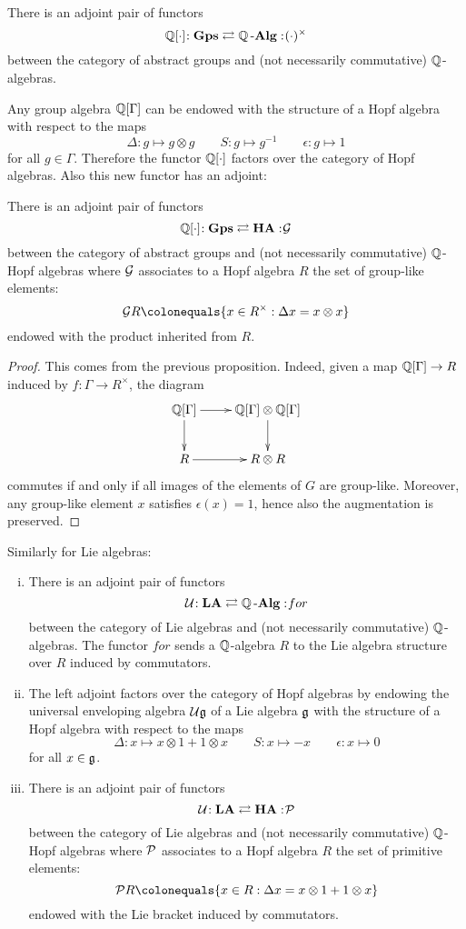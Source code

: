 \begin{prop}
There is an adjoint pair of functors
\[
\mathbb{Q}[\cdot]\negmedspace: \operatorname{\bf{Gps}}\rightleftarrows \mathbb{Q}\operatorname{\bf{-Alg}}:\negmedspace (\cdot)^\times
\]
between the category of abstract groups and (not necessarily commutative) $\mathbb{Q}$-algebras.
\end{prop}

Any group algebra $\mathbb{Q}[\Gamma]$ can be endowed with the structure of a Hopf algebra with respect to the maps
\[
\Delta: g\mapsto g\otimes g\qquad
S: g\mapsto g^{-1}\qquad
\epsilon: g\mapsto1
\]
for all $g\in\Gamma$. Therefore the functor $\mathbb{Q}[\cdot]$ factors over the category of Hopf algebras. Also this new functor has an adjoint:
\begin{prop}
There is an adjoint pair of functors
\[
\mathbb{Q}[\cdot]\negmedspace: \operatorname{\bf{Gps}}\rightleftarrows \operatorname{\bf{HA}}:\negmedspace \mathcal{G}
\]
between the category of abstract groups and (not necessarily commutative) $\mathbb{Q}$-Hopf algebras where $\mathcal{G}$ associates to a Hopf algebra $R$ the set of group-like elements:
\[
\cG R \colonequals\{x\in R^\times: \Delta x=x\otimes x\}
\]
endowed with the product inherited from $R$.
\end{prop}

\begin{proof}
This comes from the previous proposition. Indeed, given a map $\mathbb{Q}[\Gamma]\to R$ induced by $f:\Gamma\to R^\times$, the diagram 
$$\xymatrix{
\Q[\Gamma]\ar[r]\ar[d]&\Q[\Gamma]\otimes\Q[\Gamma]\ar[d]\\
R\ar[r]&R\otimes R
}$$
commutes if and only if all images of the elements of $G$ are group-like. Moreover, any group-like element $x$ satisfies $\epsilon(x)=1$, hence also the augmentation is preserved.
\end{proof}

Similarly for Lie algebras:
\begin{prop}\begin{enumerate}[(i)]
\item There is an adjoint pair of functors
\[
\mathcal{U}\negmedspace: \operatorname{\bf{LA}}\rightleftarrows \mathbb{Q}\operatorname{\bf{-Alg}}:\negmedspace for
\]
between the category of Lie algebras and (not necessarily commutative) $\mathbb{Q}$-algebras. The functor $for$ sends a $\mathbb{Q}$-algebra $R$ to the Lie algebra structure over $R$ induced by commutators.
\item The left adjoint factors over the category of Hopf algebras by endowing the universal enveloping algebra $\mathcal{U}\mathfrak{g}$ of a Lie algebra $\mathfrak{g}$ with the structure of a Hopf algebra with respect to the maps
\[
\Delta: x\mapsto x\otimes1+1\otimes x\qquad
S: x\mapsto -x\qquad
\epsilon: x\mapsto0
\]
for all $x\in\mathfrak{g}$.
\item There is an adjoint pair of functors
\[
\mathcal{U}\negmedspace: \operatorname{\bf{LA}}\rightleftarrows \operatorname{\bf{HA}}:\negmedspace \mathcal{P}
\]
between the category of Lie algebras and (not necessarily commutative) $\mathbb{Q}$-Hopf algebras where $\mathcal{P}$ associates to a Hopf algebra $R$ the set of primitive elements:
\[
\cP R \colonequals\{x\in R: \Delta x=x\otimes 1+1\otimes x\}
\]
endowed with the Lie bracket induced by commutators.
\end{enumerate}
\end{prop}

